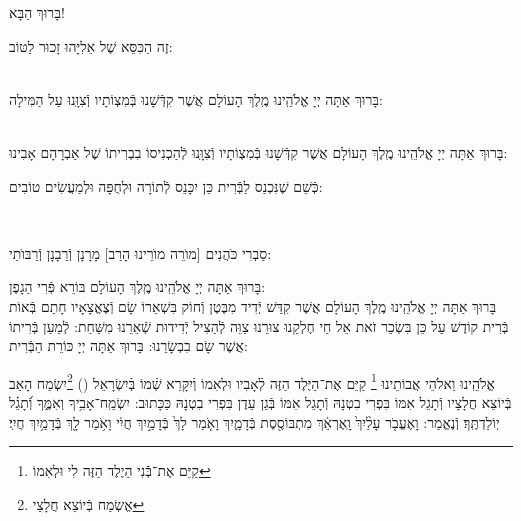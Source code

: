 \documentclass[twoside, openany, parskip=half, 11pt]{book}
\begin{document}
\begin{Large}
בָּרוּךְ הַבָּא!

\end{Large}

זֶה הַכִּסֵּא שֶׁל אֵלִיָּהוּ זָכוּר לַטּוֹב:


\\
בָּרוּךְ אַתָּה יְיָ אֱלֹהֵֽינוּ מֶֽלֶךְ הָעוֹלָם אֲשֶׁר קִדְּֿשָׁנוּ בְּֿמִצְוֹתָיו וְֿצִוָּֽנוּ עַל הַמִּילָה:

\\
בָּרוּךְ אַתָּה יְיָ אֱלֹהֵֽינוּ מֶֽלֶךְ הָעוֹלָם אֲשֶׁר קִדְּֿשָׁנוּ בְּֿמִצְוֹתָיו וְֿצִוָּֽנוּ לְֿהַכְנִיסוֹ בִבְרִיתוֹ שֶׁל אַבְרָהָם אָבִינוּ:

\kahal
כְּֿשֵׁם שֶׁנִּכְנַס לַבְּֿרִית כֵּן יִכָּנֵס לְֿתוֹרָה וּלְחֻפָּה וּלְמַעֲשִׂים טוֹבִים:

\\
\begin{footnotesize}
סַבְרִי כֹּהֲנִים [מוׂרֵה מוׂרֵינוּ הָרַב] מָרָנָן וְֿרַבָנָן וְֿרַבּוׂתַי:\\
\end{footnotesize}
בָּרוּךְ אַתָּה יְיָ אֱלֹהֵֽינוּ מֶֽלֶךְ הָעוֹלָם בּוֹרֵא פְּֿרִי הַגָפֶן:\\
בָּרוּךְ אַתָּה יְיָ אֱלֹהֵֽינוּ מֶֽלֶךְ הָעוֹלָם אֲשֶׁר קִדַּשׁ יְֿדִיד מִבֶּטֶן וְֿחוֹק בִּשְׁאֵרוֹ שָׂם וְֿצֶאֱצָאָיו חָתַם בְּֿאוֹת בְּֿרִית קוֹדֶשׁ עַל כֵּן בִּשְׂכַר זֹאת אֵל חַי חֶלְקֵנוּ צוּרֵנוּ צַוֵּה לְֿהַצִיל יְֿדִידוּת שְֿׁאֵרֵנוּ מִשַּׁחַת: לְֿמַעַן בְּֿרִיתוֹ אֲשֶׁר שָׂם בִבְשָׂרֵנוּ: בָּרוּךְ אַתָּה יְיָ כּוֹרֵת הַבְּֿרִית:

אֱלֹהֵֽינוּ וֵאלֹהֵי אֲבוֹתֵינוּ \footnote{
קַיֵּם אֶת־בְּֿֿנִי הַיֶלֶד הַזֶּה לִי וּלְאִמוֹ} קַיֵּם אֶת־הַיֶּלֶד הַזֶּה לְֿאָבִיו וּלְאִמוֹ וְֿיִקָּרֵא שְֿׁמוֹ בְּֿיִשְׂרָאֵל () \footnote{
אֱשְׂמַח בְּֿיוֹצֵא חֲלָצַי}יִשְׂמַח הָאַב בְּֿיוֹצֵא חֲלָצָיו וְֿתָגֵל אִמּוֹ בִּפְרִי בִטְנָהּ וְֿתָגֵל אִמּוֹ בְּֿגַן עֵדֶן בִּפְרִי בִטְנָהּ
כַּכָּתוּב: יִשְׂמַֽח־אָבִ֥יךָ וְאִמֶּ֑ךָ וְֿ֝תָגֵ֗ל יֽוֹלַדְתֶּֽךָ׃
וְֿנֶאֱמַר: וָאֶעֱבֹ֤ר עָלַ֨יִךְ֙ וָֽאֶרְאֵ֔ךְ מִתְבּוֹסֶ֖סֶת בְּֿדָמָ֑יִךְ
וָאֹ֤מַר לָךְ֙ בְּֿדָמַ֣יִךְ חֲיִ֔י וָאֹ֥מַר לָ֖ךְ בְּֿדָמַ֥יִךְ חֲיִֽי׃
\end{document}
